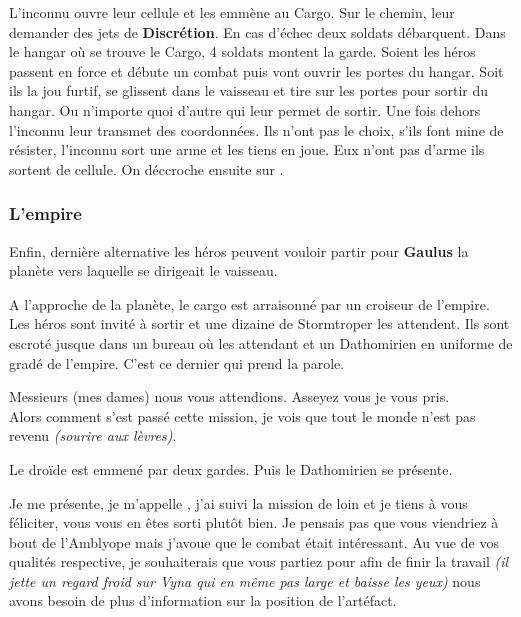 L'inconnu ouvre leur cellule et les emmène au Cargo. Sur le chemin, leur demander des jets de \textbf{Discrétion}. En cas d'échec deux soldats débarquent. Dans le hangar où se trouve le Cargo, 4 soldats montent la garde. Soient les héros passent en force et débute un combat puis vont ouvrir les portes du hangar. Soit ils la jou furtif, se glissent dans le vaisseau et tire sur les portes pour sortir du hangar. Ou n'importe quoi d'autre qui leur permet de sortir. Une fois dehors l'inconnu leur transmet des coordonnées. Ils n'ont pas le choix, s'ils font mine de résister, l'inconnu sort une arme et les tiens en joue. Eux n'ont pas d'arme ils sortent de cellule. On déccroche ensuite sur .



\subsubsection{L’empire} \label{sec:l-empire}
Enfin, dernière alternative les héros peuvent vouloir partir pour \textbf{Gaulus} la planète vers laquelle se dirigeait le vaisseau. 

A l'approche de la planète, le cargo est arraisonné par un croiseur de l'empire. Les héros sont invité à sortir et une dizaine de Stormtroper les attendent. Ils sont escroté jusque dans un bureau où les attendant  et un Dathomirien en uniforme de gradé de l'empire. C'est ce dernier qui prend la parole.

\begin{quotebox}
    Messieurs (mes dames) nous vous attendions. Asseyez vous je vous pris. \\
    Alors comment s'est passé cette mission, je vois que tout le monde n'est pas revenu \emph{(sourire aux lèvres)}. 
\end{quotebox}

Le droïde est emmené par deux gardes. Puis le Dathomirien se présente.

\begin{quotebox}
    Je me présente, je m'appelle , j'ai suivi la mission de loin et je tiens à vous féliciter, vous vous en êtes sorti plutôt bien. Je pensais pas que vous viendriez à bout de l'Amblyope mais j'avoue que le combat était intéressant. Au vue de vos qualités respective, je souhaiterais que vous partiez pour  afin de finir la travail \emph{(il jette un regard froid sur Vyna qui en même pas large et baisse les yeux)} nous avons besoin de plus d'information sur la position de l'artéfact.
\end{quotebox}

